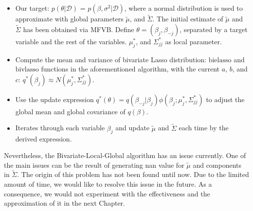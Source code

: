 \begin{itemize}
	\item Our target: $p(\theta|\mathcal{D})$ = $p(\beta, \sigma^2|\mathcal{D})$, where a normal distribution is used to approximate with global parameters $\tilde{\mu}$, and $\tilde{\Sigma}$. The initial estimate of $\tilde{\mu}$ and $\tilde{\Sigma}$ has been obtained via MFVB. Define $\theta = (\beta_j,\beta_{-j})$, separated by a target variable and the rest of the variables. $\mu_{j}^*$, and $\Sigma_{jj}^*$ as local parameter.
	\item Compute the mean and variance of bivariate Lasso distribution: $\text{bielasso}$ and $\text{bivlasso}$ functions in the aforementioned algorithm, with the current $a$, $b$, and $c$: $q^*(\beta_j) \approx N(\mu_j^*,\Sigma_{jj}^*)$.
	\item Use the update expression $q^*(\theta) = q(\beta_{-j}|\beta_j)\phi(\beta_j;\mu_j^*,\Sigma_{jj}^*)$ to adjust the global mean and global covariance of $q(\beta)$.
	\item Iterates through each variable $\beta_j$ and update $\tilde{\mu}$ and $\tilde{\Sigma}$ each time by the derived expression.
\end{itemize}

Nevertheless, the Bivariate-Local-Global algorithm has an issue currently. One of the main issues can be the result of generating nan value for $\tilde{\mu}$ and components in $\tilde{\Sigma}$. The origin of this problem has not been found until now. Due to the limited amount of time, we would like to resolve this issue in the future. As a consequence, we would not experiment with the effectiveness and the approximation of it in the next Chapter.